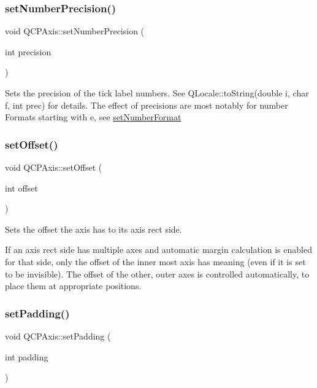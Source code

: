 \subsubsection{\texorpdfstring{setNumberPrecision()}{setNumberPrecision()}}
{\footnotesize\ttfamily void Q\+C\+P\+Axis\+::set\+Number\+Precision (\begin{DoxyParamCaption}\item[{int}]{precision }\end{DoxyParamCaption})}

Sets the precision of the tick label numbers. See Q\+Locale\+::to\+String(double i, char f, int prec) for details. The effect of precisions are most notably for number Formats starting with \textquotesingle{}e\textquotesingle{}, see \mbox{\hyperlink{class_q_c_p_axis_ae585a54dc2aac662e90a2ca82f002590}{set\+Number\+Format}} \mbox{\label{class_q_c_p_axis_a04a652603cbe50eba9969ee6d68873c3}} 
\subsubsection{\texorpdfstring{setOffset()}{setOffset()}}
{\footnotesize\ttfamily void Q\+C\+P\+Axis\+::set\+Offset (\begin{DoxyParamCaption}\item[{int}]{offset }\end{DoxyParamCaption})}

Sets the offset the axis has to its axis rect side.

If an axis rect side has multiple axes and automatic margin calculation is enabled for that side, only the offset of the inner most axis has meaning (even if it is set to be invisible). The offset of the other, outer axes is controlled automatically, to place them at appropriate positions. \mbox{\label{class_q_c_p_axis_a5691441cb3de9e9844855d339c0db279}} 
\subsubsection{\texorpdfstring{setPadding()}{setPadding()}}
{\footnotesize\ttfamily void Q\+C\+P\+Axis\+::set\+Padding (\begin{DoxyParamCaption}\item[{int}]{padding }\end{DoxyParamCaption})}

